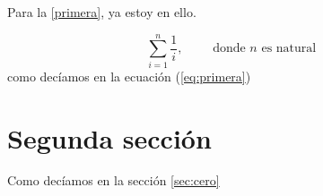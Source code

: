 \documentclass[12pt,
               spanish
              ]{article}
\begin{document}
Para la \ref{primera}, ya estoy en ello.

\begin{equation}
  \label{eq:primera}
  \sum_{i=1}^{n}\frac{1}{i},\qquad\text{ donde } n \text{ es natural }
\end{equation}
como decíamos en la ecuación (\ref{eq:primera})

\section{Segunda sección}
\label{sec:segunda}

Como decíamos en la sección \ref{sec:cero}
\end{document}
